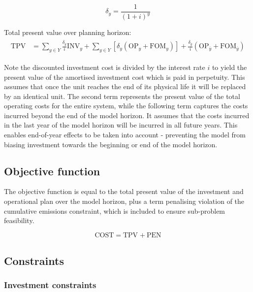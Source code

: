 \documentclass{article}
\newcommand{\sYears}{Y}
\newcommand{\iYear}{y}
\newcommand{\iYearTerminal}{\overline{\iYear}}
\newcommand{\iScenario}{s}
\newcommand{\cOperatingCost}[1][\iYear,\iScenario]{\mathrm{OP}_{#1}}
\newcommand{\cFixedOperationsMaintenanceCost}[1][\iYear]{\mathrm{FOM}_{#1}}
\newcommand{\cInvestmentCost}[1][\iYear]{\mathrm{INV}_{#1}}
\newcommand{\cInterestRate}{i}
\newcommand{\cTotalPresentValue}[1][]{\mathrm{TPV}_{#1}}
\newcommand{\cEmissionsViolationTotalCost}{\mathrm{PEN}}
\newcommand{\cObjectiveFunction}{\mathrm{COST}}
\newcommand{\cDiscountRate}[1][\iYear]{\delta_{#1}}
\begin{document}
\begin{equation}
	\cDiscountRate = \frac{1}{(1 + \cInterestRate)^{\iYear}}
\end{equation}

Total present value over planning horizon:
\begin{align}
\begin{split}
\cTotalPresentValue & = \sum\limits_{\iYear \in \sYears} \frac{\cDiscountRate}{\cInterestRate}\cInvestmentCost + \sum\limits_{\iYear \in \sYears} \left[\cDiscountRate (\cOperatingCost[\iYear] + \cFixedOperationsMaintenanceCost) \right] + \frac{\cDiscountRate[\iYearTerminal]}{\cInterestRate} \left(\cOperatingCost[\iYearTerminal] + \cFixedOperationsMaintenanceCost[\iYearTerminal] \right)
\end{split}
\end{align}

Note the discounted investment cost is divided by the interest rate $\cInterestRate$ to yield the present value of the amortised investment cost which is paid in perpetuity. This assumes that once the unit reaches the end of its physical life it will be replaced by an identical unit. The second term represents the present value of the total operating costs for the entire system, while the following term captures the costs incurred beyond the end of the model horizon. It assumes that the costs incurred in the last year of the model horizon will be incurred in all future years. This enables end-of-year effects to be taken into account - preventing the model from biasing investment towards the beginning or end of the model horizon.

\subsection{Objective function}
The objective function is equal to the total present value of the investment and operational plan over the model horizon, plus a term penalising violation of the cumulative emissions constraint, which is included to ensure sub-problem feasibility.

\begin{equation}
\cObjectiveFunction = \cTotalPresentValue + \cEmissionsViolationTotalCost
\end{equation}


\subsection{Constraints}
\subsubsection{Investment constraints}
\end{document}
